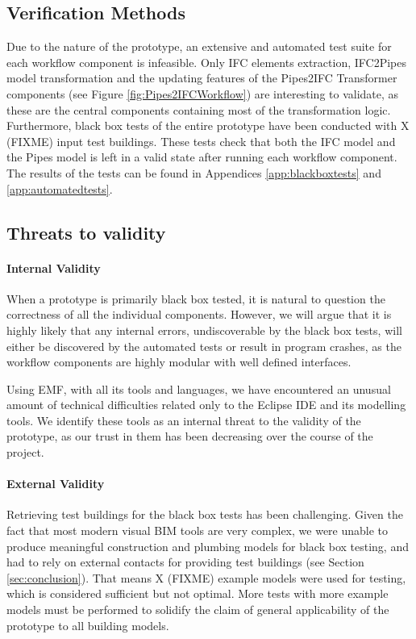 \subsection{Verification Methods}
\label{subsec:verification_methods}
Due to the nature of the prototype, an extensive and automated test suite for each workflow component is infeasible. Only IFC elements extraction, IFC2Pipes model transformation and the updating features of the Pipes2IFC Transformer components (see Figure \ref{fig:Pipes2IFCWorkflow}) are interesting to validate, as these are the central components containing most of the transformation logic. Furthermore, black box tests of the entire prototype have been conducted with X (FIXME) input test buildings. These tests check that both the IFC model and the Pipes model is left in a valid state after running each workflow component. The results of the tests can be found in Appendices \ref{app:blackboxtests} and \ref{app:automatedtests}.

\subsection{Threats to validity}
\paragraph{Internal Validity} When a prototype is primarily black box tested, it is natural to question the correctness of all the individual components. However, we will argue that it is highly likely that any internal errors, undiscoverable by the black box tests, will either be discovered by the automated tests or result in program crashes, as the workflow components are highly modular with well defined interfaces.

Using EMF, with all its tools and languages, we have encountered an unusual amount of technical difficulties related only to the Eclipse IDE and its modelling tools. We identify these tools as an internal threat to the validity of the prototype, as our trust in them has been decreasing over the course of the project.

\paragraph{External Validity} Retrieving test buildings for the black box tests has been challenging. Given the fact that most modern visual BIM tools are very complex, we were unable to produce meaningful construction and plumbing models for black box testing, and had to rely on external contacts for providing test buildings (see Section \ref{sec:conclusion}). That means X (FIXME) example models were used for testing, which is considered sufficient but not optimal. More tests with more example models must be performed to solidify the claim of general applicability of the prototype to all building models.

